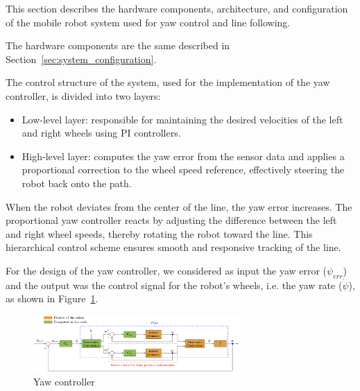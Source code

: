 This section describes the hardware components, architecture, and configuration of the mobile robot system used for yaw control and line following.

The hardware components are the same described in Section~\ref{sec:system_configuration}.

The control structure of the system, used for the implementation of the yaw controller, is divided into two layers:
\begin{itemize}
    \item Low-level layer: responsible for maintaining the desired velocities of the left and right wheels using PI controllers.
    \item High-level layer: computes the yaw error from the sensor data and applies a proportional correction to the wheel speed reference, effectively steering the robot back onto the path.
\end{itemize} 

When the robot deviates from the center of the line, the yaw error increases. 
The proportional yaw controller reacts by adjusting the difference between the left and right wheel speeds, thereby rotating the robot toward the line. 
This hierarchical control scheme ensures smooth and responsive tracking of the line.

For the design of the yaw controller, we considered as input the yaw error ($\psi_{err}$) and the output was the control signal for the robot's wheels, i.e. the yaw rate ($\dot{\psi}$), as shown in Figure~\ref{fig:yaw_controller}.
\begin{figure}[H]
    \centering
    \includegraphics[width=0.7\textwidth]{lab4/figures/yaw_controller.png}
    \caption{Yaw controller}
    \label{fig:yaw_controller}
\end{figure}
